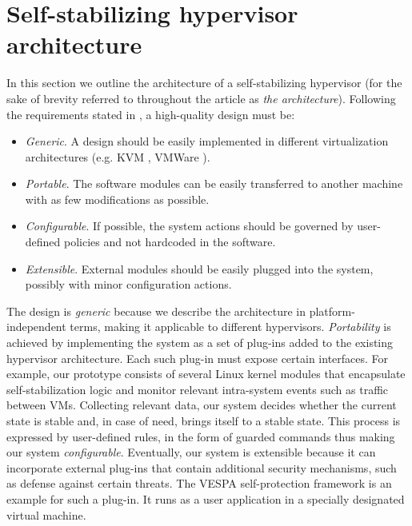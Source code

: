 
\section{\label{sec:The-architecture}Self-stabilizing hypervisor architecture}

In this section we outline the architecture of a self-stabilizing
hypervisor (for the sake of brevity referred to throughout the article
as \textit{the architecture}). Following the requirements stated in
\cite{martin-agile:2003}, a high-quality design must be: 
\begin{itemize}
\item \textit{Generic}. A design should be easily implemented in different
virtualization architectures (e.g. KVM \cite{kvm-site}, VMWare \cite{vmware-site}). 
\item \textit{Portable}. The software modules can be easily transferred
to another machine with as few modifications as possible. 
\item \textit{Configurable}. If possible, the system actions should be governed
by user-defined policies and not hardcoded in the software. 
\item \textit{Extensible}. External modules should be easily plugged into
the system, possibly with minor configuration actions. 
\end{itemize}
The design is \textit{generic} because we describe the architecture
in platform-independent terms, making it applicable to different hypervisors.
\textit{Portability} is achieved by implementing the system as a set
of plug-ins added to the existing hypervisor architecture. Each such
plug-in must expose certain interfaces. For example, our prototype
consists of several Linux kernel modules that encapsulate self-stabilization
logic and monitor relevant intra-system events such as traffic between
VMs. Collecting relevant data, our system decides whether the current
state is stable and, in case of need, brings itself to a stable state.
This process is expressed by user-defined rules, in the form of guarded
commands \cite{Dijkstra:1975:Guarded} thus making our system \textit{configurable}.
Eventually, our system is extensible because it can incorporate external
plug-ins that contain additional security mechanisms, such as defense
against certain threats. The VESPA self-protection framework \cite{Wailly:2012:VMS:2371536.2371564}
is an example for such a plug-in. It runs as a user application in
a specially designated virtual machine.

